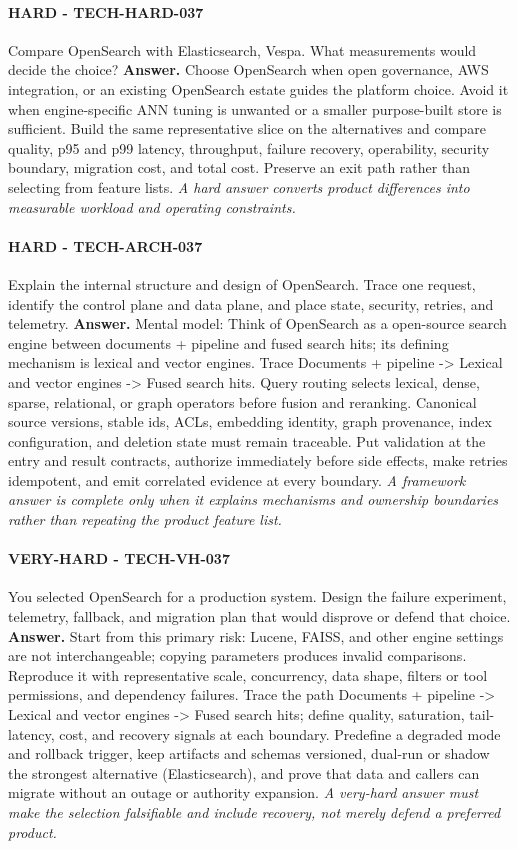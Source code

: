 \paragraph{HARD - TECH-HARD-037} Compare OpenSearch with Elasticsearch, Vespa. What measurements would decide the choice?
\textbf{Answer.} Choose OpenSearch when open governance, AWS integration, or an existing OpenSearch estate guides the platform choice. Avoid it when engine-specific ANN tuning is unwanted or a smaller purpose-built store is sufficient. Build the same representative slice on the alternatives and compare quality, p95 and p99 latency, throughput, failure recovery, operability, security boundary, migration cost, and total cost. Preserve an exit path rather than selecting from feature lists.
\textit{A hard answer converts product differences into measurable workload and operating constraints.}
\paragraph{HARD - TECH-ARCH-037} Explain the internal structure and design of OpenSearch. Trace one request, identify the control plane and data plane, and place state, security, retries, and telemetry.
\textbf{Answer.} Mental model: Think of OpenSearch as a open-source search engine between documents + pipeline and fused search hits; its defining mechanism is lexical and vector engines. Trace Documents + pipeline -> Lexical and vector engines -> Fused search hits. Query routing selects lexical, dense, sparse, relational, or graph operators before fusion and reranking. Canonical source versions, stable ids, ACLs, embedding identity, graph provenance, index configuration, and deletion state must remain traceable. Put validation at the entry and result contracts, authorize immediately before side effects, make retries idempotent, and emit correlated evidence at every boundary.
\textit{A framework answer is complete only when it explains mechanisms and ownership boundaries rather than repeating the product feature list.}
\paragraph{VERY-HARD - TECH-VH-037} You selected OpenSearch for a production system. Design the failure experiment, telemetry, fallback, and migration plan that would disprove or defend that choice.
\textbf{Answer.} Start from this primary risk: Lucene, FAISS, and other engine settings are not interchangeable; copying parameters produces invalid comparisons. Reproduce it with representative scale, concurrency, data shape, filters or tool permissions, and dependency failures. Trace the path Documents + pipeline -> Lexical and vector engines -> Fused search hits; define quality, saturation, tail-latency, cost, and recovery signals at each boundary. Predefine a degraded mode and rollback trigger, keep artifacts and schemas versioned, dual-run or shadow the strongest alternative (Elasticsearch), and prove that data and callers can migrate without an outage or authority expansion.
\textit{A very-hard answer must make the selection falsifiable and include recovery, not merely defend a preferred product.}
